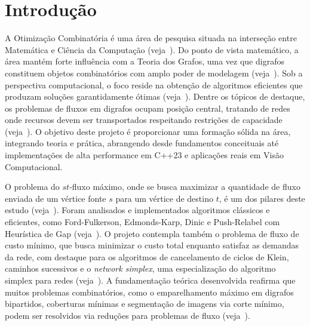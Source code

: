 \section{Introdução}\label{sec:introducao}

A Otimização Combinatória é uma área de pesquisa situada na interseção entre Matemática e Ciência da Computação (veja~\cite{korte2018combinatorial}). Do ponto de vista matemático, a área mantém forte influência com a Teoria dos Grafos, uma vez que digrafos constituem objetos combinatórios com amplo poder de modelagem (veja~\cite{bondy2008graph, diestel2017graph}).
Sob a perspectiva computacional, o foco reside na obtenção de algoritmos eficientes que produzam soluções garantidamente ótimas (veja~\cite{schrijver2003combinatorial, cook1998combinatorial}). Dentre os tópicos de destaque, os problemas de fluxos em digrafos ocupam posição central, tratando de redes onde recursos devem ser transportados respeitando restrições de capacidade (veja~\cite{ahuja1993network}).
O objetivo deste projeto é proporcionar uma formação sólida na área, integrando teoria e prática, abrangendo desde fundamentos conceituais até implementações de alta performance em C++23 e aplicações reais em Visão Computacional.

O problema do $st$-fluxo máximo, onde se busca maximizar a quantidade de fluxo enviada de um vértice fonte $s$ para um vértice de destino $t$, é um dos pilares deste estudo (veja~\cite{ford1956maximal}). Foram analisados e implementados algoritmos clássicos e eficientes, como Ford-Fulkerson, Edmonds-Karp, Dinic e Push-Relabel com Heurística de Gap (veja~\cite{ford1956maximal, edmonds1972theoretical, dinic1970algorithm, goldberg1988new}).
O projeto contempla também o problema de fluxo de custo mínimo, que busca minimizar o custo total enquanto satisfaz as demandas da rede, com destaque para os algoritmos de cancelamento de ciclos de Klein, caminhos sucessivos e o \textit{network simplex}, uma especialização do algoritmo simplex para redes (veja~\cite{dantzig1951application, ahuja1993network}).
A fundamentação teórica desenvolvida reafirma que muitos problemas combinatórios, como o emparelhamento máximo em digrafos bipartidos, coberturas mínimas e segmentação de imagens via corte mínimo, podem ser resolvidos via reduções para problemas de fluxo (veja~\cite{ahuja1993network, boykov2001interactive}).
